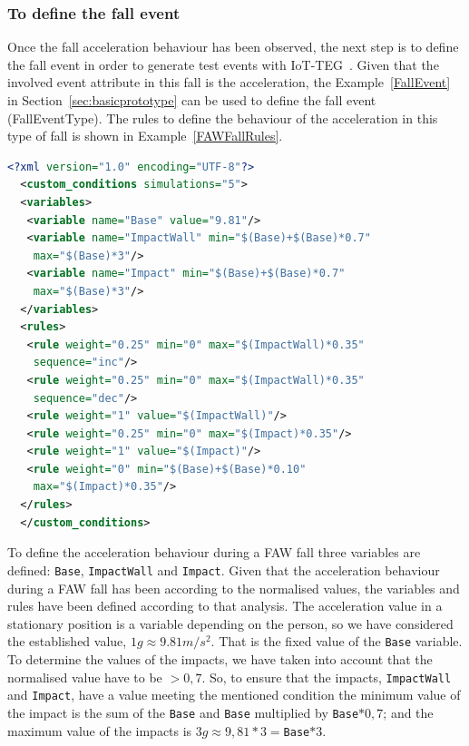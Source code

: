 \documentclass[journal]{IEEEtran}
\begin{document}
\subsubsection*{To define the fall event} Once the fall acceleration behaviour has been observed, the next step is to define the 
fall event in order to generate test events with IoT-TEG~\cite{TesisGutierrez2017,Gutierrez2017}. Given that the involved event 
attribute in this fall is the acceleration, the Example~\ref{FallEvent} in Section~\ref{sec:basicprototype} can be used to define 
the fall event (FallEventType). The rules to define the behaviour of the acceleration in this type of fall is shown in 
Example~\ref{FAWFallRules}.

\begin{lstlisting}[basicstyle=\ttfamily\scriptsize,language=XML,caption={Rules to define a FAW fall},label=FAWFallRules]
  <?xml version="1.0" encoding="UTF-8"?>
  <custom_conditions simulations="5">
  <variables>
   <variable name="Base" value="9.81"/>
   <variable name="ImpactWall" min="$(Base)+$(Base)*0.7" 
    max="$(Base)*3"/>
   <variable name="Impact" min="$(Base)+$(Base)*0.7" 
    max="$(Base)*3"/>
  </variables>
  <rules>
   <rule weight="0.25" min="0" max="$(ImpactWall)*0.35" 
    sequence="inc"/>
   <rule weight="0.25" min="0" max="$(ImpactWall)*0.35" 
    sequence="dec"/>
   <rule weight="1" value="$(ImpactWall)"/>
   <rule weight="0.25" min="0" max="$(Impact)*0.35"/>
   <rule weight="1" value="$(Impact)"/>
   <rule weight="0" min="$(Base)+$(Base)*0.10"
    max="$(Impact)*0.35"/>
  </rules>
  </custom_conditions>
\end{lstlisting}

To define the acceleration behaviour during a FAW fall three variables are defined: \texttt{\small{Base}}, 
\texttt{\small{ImpactWall}} and \texttt{\small{Impact}}. Given that the acceleration behaviour during a FAW fall has
been according to the normalised values, the variables and rules have been defined according to 
that analysis. The acceleration value in a stationary position is a variable depending on the person, so 
we have considered the established value, $1g\approx9.81m/s^{2}$. That is the fixed value of the 
\texttt{\small{Base}} variable. To determine the values of the impacts, we have taken into account that the 
normalised value have to be $> 0,7$. So, to ensure that the impacts, \texttt{\small{ImpactWall}} and 
\texttt{\small{Impact}}, have a value meeting the mentioned condition the minimum value of the impact is the 
sum of the \texttt{\small{Base}} and \texttt{\small{Base}} multiplied by \texttt{\small{Base}}$*0,7$; and the maximum value of the
impacts is $3g\approx9,81*3=$\texttt{\small{Base}}$*3$.
\end{document}
